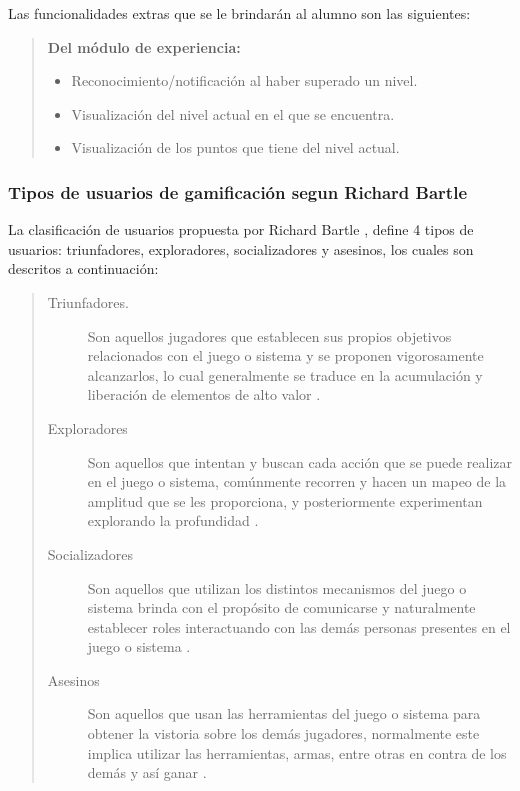     \noindent
    Las funcionalidades extras que se le brindarán al alumno son las siguientes:

    \begin{quote}
    {\bf Del módulo de experiencia:}
        \begin{itemize}
        \item Reconocimiento/notificación al haber superado un nivel.
        \item Visualización del nivel actual en el que se encuentra.
        \item Visualización de los puntos que tiene del nivel actual.
        \end{itemize}
    \end{quote}

    \subsubsection{Tipos de usuarios de gamificación segun Richard Bartle}

    La clasificación de usuarios propuesta por Richard Bartle \cite{BartleUsuarios}, define
    4 tipos de usuarios: triunfadores, exploradores, socializadores y asesinos, los cuales son
    descritos a continuación:
    
        \begin{quote}
        \begin{description}
        \item[Triunfadores.]
            Son aquellos jugadores que establecen sus propios objetivos relacionados con
            el juego o sistema y se proponen vigorosamente alcanzarlos, lo cual generalmente
            se traduce en la acumulación y liberación de elementos de alto valor
            \cite[p. 3]{BartleUsuarios}.

        \item[Exploradores]
            Son aquellos que intentan y buscan cada acción que se puede realizar en el
            juego o sistema, comúnmente recorren y hacen un mapeo de la amplitud que se
            les proporciona, y posteriormente experimentan explorando la profundidad
            \cite[p. 4]{BartleUsuarios}.

        \item[Socializadores]
            Son aquellos que utilizan los distintos mecanismos del juego o sistema brinda
            con el propósito de comunicarse y naturalmente establecer roles interactuando
            con las demás personas presentes en el juego o sistema
            \cite[p. 4]{BartleUsuarios}.

        \item[Asesinos]
            Son aquellos que usan las herramientas del juego o sistema para obtener la
            vistoria sobre los demás jugadores, normalmente este implica utilizar las
            herramientas, armas, entre otras en contra de los demás y así ganar
            \cite[p. 4]{BartleUsuarios}.

        \end{description}
        \end{quote}

